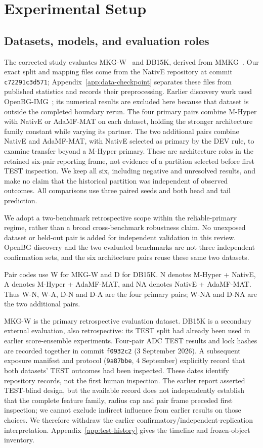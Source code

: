 \documentclass[11pt,a4paper]{article}
\begin{document}
\FloatBarrier
\section{Experimental Setup}
\label{sec:setup}

\subsection{Datasets, models, and evaluation roles}
The corrected study evaluates MKG-W~\citep{mkgw_origin} and DB15K, derived from MMKG~\citep{mmkg_origin}. Our exact split and mapping files come from the NativE repository at commit \texttt{c72291c3d571}; Appendix~\ref{app:data-checkpoint} separates these files from published statistics and records their preprocessing. Earlier discovery work used OpenBG-IMG~\citep{openbg}; its numerical results are excluded here because that dataset is outside the completed boundary rerun. The four primary pairs combine M-Hyper with NativE or AdaMF-MAT on each dataset, holding the stronger architecture family constant while varying its partner. The two additional pairs combine NativE and AdaMF-MAT, with NativE selected as primary by the DEV rule, to examine transfer beyond a M-Hyper primary. These are architecture roles in the retained six-pair reporting frame, not evidence of a partition selected before first TEST inspection. We keep all six, including negative and unresolved results, and make no claim that the historical partition was independent of observed outcomes. All comparisons use three paired seeds and both head and tail prediction.

We adopt a two-benchmark retrospective scope within the reliable-primary regime, rather than a broad cross-benchmark robustness claim. No unexposed dataset or held-out pair is added for independent validation in this review. OpenBG discovery and the two evaluated benchmarks are not three independent confirmation sets, and the six architecture pairs reuse these same two datasets.

Pair codes use W for MKG-W and D for DB15K. N denotes M-Hyper + NativE, A denotes M-Hyper + AdaMF-MAT, and NA denotes NativE + AdaMF-MAT. Thus W-N, W-A, D-N and D-A are the four primary pairs; W-NA and D-NA are the two additional pairs.

MKG-W is the primary retrospective evaluation dataset. DB15K is a secondary external evaluation, also retrospective: its TEST split had already been used in earlier score-ensemble experiments. Four-pair ADC TEST results and lock hashes are recorded together in commit \texttt{f0932c2} (3 September 2026). A subsequent exposure manifest and protocol (\texttt{9a87bbe}, 4 September) explicitly record that both datasets' TEST outcomes had been inspected. These dates identify repository records, not the first human inspection. The earlier report asserted TEST-blind design, but the available record does not independently establish that the complete feature family, radius cap and pair frame preceded first inspection; we cannot exclude indirect influence from earlier results on those choices. We therefore withdraw the earlier confirmatory/independent-replication interpretation. Appendix~\ref{app:test-history} gives the timeline and frozen-object inventory.
\end{document}
